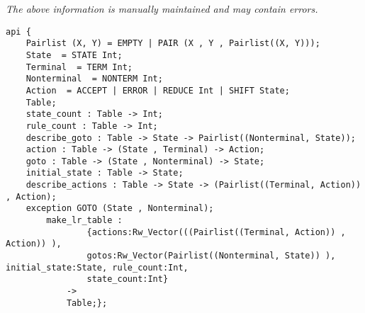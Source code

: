 \label{api:Lr\_Table}

{\tiny \it The above information is manually maintained and may contain errors.}
\begin{verbatim}
api {
    Pairlist (X, Y) = EMPTY | PAIR (X , Y , Pairlist((X, Y)));
    State  = STATE Int;
    Terminal  = TERM Int;
    Nonterminal  = NONTERM Int;
    Action  = ACCEPT | ERROR | REDUCE Int | SHIFT State;
    Table;
    state_count : Table -> Int;
    rule_count : Table -> Int;
    describe_goto : Table -> State -> Pairlist((Nonterminal, State));
    action : Table -> (State , Terminal) -> Action;
    goto : Table -> (State , Nonterminal) -> State;
    initial_state : Table -> State;
    describe_actions : Table -> State -> (Pairlist((Terminal, Action)) , Action);
    exception GOTO (State , Nonterminal);
        make_lr_table :
                {actions:Rw_Vector(((Pairlist((Terminal, Action)) , Action)) ),
                gotos:Rw_Vector(Pairlist((Nonterminal, State)) ), initial_state:State, rule_count:Int,
                state_count:Int}
            ->
            Table;};
\end{verbatim}
